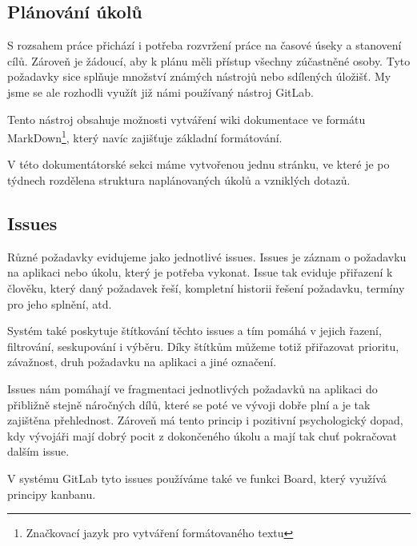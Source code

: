 \documentclass[czech,BP]{thesiskiv}
\begin{document}
\subsection{Plánování úkolů}
	\par S rozsahem práce přichází i potřeba rozvržení práce na časové úseky a stanovení cílů. Zároveň je žádoucí, aby k plánu měli přístup všechny zúčastněné osoby. Tyto požadavky sice splňuje množství známých nástrojů nebo sdílených úložišť. My jsme se ale rozhodli využít již námi používaný nástroj GitLab.
	\par Tento nástroj obsahuje možnosti vytváření wiki dokumentace ve formátu MarkDown\footnote{Značkovací jazyk pro vytváření formátovaného textu}, který navíc zajišťuje základní formátování.
	\par V této dokumentátorské sekci máme vytvořenou jednu stránku, ve které je po týdnech rozdělena struktura naplánovaných úkolů a vzniklých dotazů.
\subsection{Issues}
	\par Různé požadavky evidujeme jako jednotlivé issues. Issues je záznam o požadavku na aplikaci nebo úkolu, který je potřeba vykonat. Issue tak eviduje přiřazení k člověku, který daný požadavek řeší, kompletní historii řešení požadavku, termíny pro jeho splnění, atd.
	\par Systém také poskytuje štítkování těchto issues a tím pomáhá v jejich řazení, filtrování, seskupování i výběru. Díky štítkům můžeme totiž přiřazovat prioritu, závažnost, druh požadavku na aplikaci a jiné označení.
	\par Issues nám pomáhají ve fragmentaci  jednotlivých požadavků na aplikaci do přibližně stejně náročných dílů, které se poté ve vývoji dobře plní a je tak zajištěna přehlednost. Zároveň má tento princip i pozitivní psychologický dopad, kdy vývojáři mají dobrý pocit z dokončeného úkolu a mají tak chuť pokračovat dalším issue.
	\par V systému GitLab tyto issues používáme také ve funkci Board, který využívá principy kanbanu.
\end{document}
